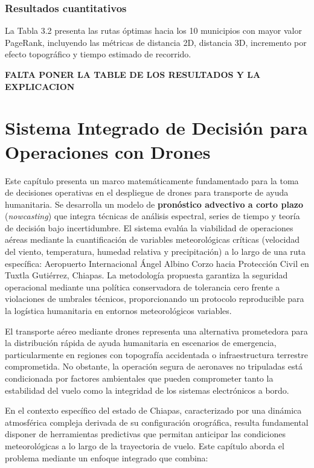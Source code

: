 \documentclass[
  spanish,
  us-letterpaper,
]{scrreprt}
\numberwithin{equation}{section}
\begin{document}
\subsection{Resultados cuantitativos}\label{resultados-cuantitativos}

La Tabla 3.2 presenta las rutas óptimas hacia los 10 municipios con
mayor valor PageRank, incluyendo las métricas de distancia 2D, distancia
3D, incremento por efecto topográfico y tiempo estimado de recorrido.

\textbf{FALTA PONER LA TABLE DE LOS RESULTADOS Y LA EXPLICACION}


\chapter{Sistema Integrado de Decisión para Operaciones con
Drones}\label{sistema-integrado-de-decisiuxf3n-para-operaciones-con-drones}

Este capítulo presenta un marco matemáticamente fundamentado para la
toma de decisiones operativas en el despliegue de drones para transporte
de ayuda humanitaria. Se desarrolla un modelo de \textbf{pronóstico
advectivo a corto plazo} (\emph{nowcasting}) que integra técnicas de
análisis espectral, series de tiempo y teoría de decisión bajo
incertidumbre. El sistema evalúa la viabilidad de operaciones aéreas
mediante la cuantificación de variables meteorológicas críticas
(velocidad del viento, temperatura, humedad relativa y precipitación) a
lo largo de una ruta específica: Aeropuerto Internacional Ángel Albino
Corzo hacia Protección Civil en Tuxtla Gutiérrez, Chiapas. La
metodología propuesta garantiza la seguridad operacional mediante una
política conservadora de tolerancia cero frente a violaciones de
umbrales técnicos, proporcionando un protocolo reproducible para la
logística humanitaria en entornos meteorológicos variables.

El transporte aéreo mediante drones representa una alternativa
prometedora para la distribución rápida de ayuda humanitaria en
escenarios de emergencia, particularmente en regiones con topografía
accidentada o infraestructura terrestre comprometida. No obstante, la
operación segura de aeronaves no tripuladas está condicionada por
factores ambientales que pueden comprometer tanto la estabilidad del
vuelo como la integridad de los sistemas electrónicos a bordo.

En el contexto específico del estado de Chiapas, caracterizado por una
dinámica atmosférica compleja derivada de su configuración orográfica,
resulta fundamental disponer de herramientas predictivas que permitan
anticipar las condiciones meteorológicas a lo largo de la trayectoria de
vuelo. Este capítulo aborda el problema mediante un enfoque integrado
que combina:
\end{document}
